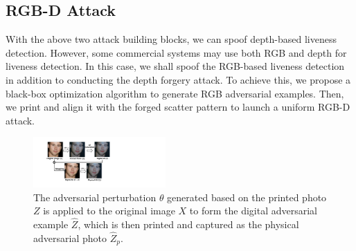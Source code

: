 \subsection{RGB-D Attack}
With the above two attack building blocks, we can spoof depth-based liveness detection. However, some commercial systems may use both RGB and depth for liveness detection. In this case, we shall spoof the RGB-based liveness detection in addition to conducting the depth forgery attack. To achieve this, we propose a black-box optimization algorithm to generate  RGB adversarial examples. Then, we print  and  align it with the forged scatter pattern to launch a uniform RGB-D attack. 

\begin{figure}[!t]
	\centering
	\includegraphics[width=0.45\textwidth]{figures/adv_mapping.pdf} 
	\vspace{-0.1in}
	\caption{The adversarial perturbation $\theta$ generated based on the printed photo $Z$ is applied to the original image $X$ to form the digital adversarial example $\widehat{Z}$, which is then printed and captured as the physical adversarial photo $\widehat{Z}_p$.}
	\label{rgb_mapping}
	\vspace{-0.15in}
\end{figure}

